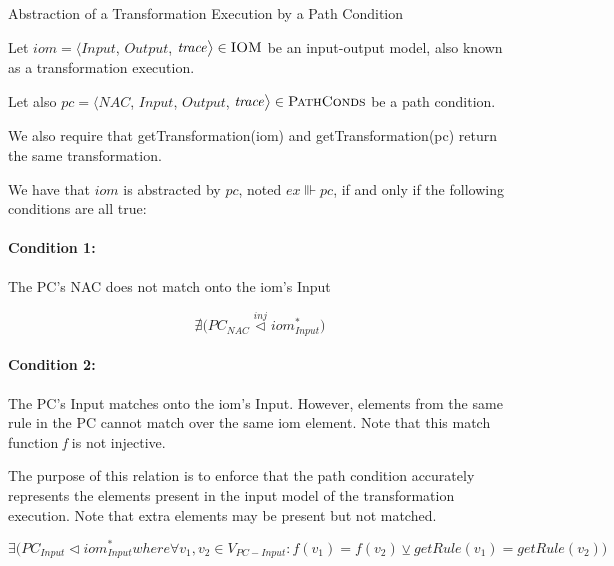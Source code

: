 \begin{definition}{Abstraction of a Transformation Execution by a Path Condition\\}
\label{def:abstraction_pc_ex}

Let $iom = \big\langle \mathit{Input}$, $\mathit{Output}$, $\mathit{trace}\big\rangle \in \textsc{IOM}$ be an input-output model, also known as a transformation execution. 

Let also $pc = \big\langle  \mathit{NAC}$, $\mathit{Input}$, $\mathit{Output}$, $\mathit{trace}\big\rangle  \in \textsc{PathConds}$ be a path condition.

We also require that getTransformation(iom) and getTransformation(pc) return the same transformation.

We have that $iom$ is abstracted by $pc$, noted $ex\Vvdash pc$, if and only if the following conditions are all true:

\end{definition}

\paragraph{Condition 1:}
The PC's NAC does not match onto the iom's Input

\begin{equation}
\label{eq:abstr_no_nac}
\nexists \big(\mathit{PC}_{NAC} \stackrel{inj}{\vartriangleleft} \mathit{iom}_{Input}^*\big)
\end{equation}

\paragraph{Condition 2:}

The PC's Input matches onto the iom's Input. However, elements from the same rule in the PC cannot match over the same iom element. Note that this match function \textit{f} is not injective.

The purpose of this relation is to enforce that the path condition accurately represents the elements present in the input model of the transformation execution. Note that extra elements may be present but not matched.

\begin{equation}
\label{eq:abstr_input_output}
\exists \big(\mathit{PC}_{Input} \vartriangleleft \mathit{iom}_{Input}^*
where \forall v_1, v_2 \in V_{PC-Input} :
f(v_1) = f(v_2) \veebar getRule(v_1) = getRule(v_2) 
\big)
\end{equation}

